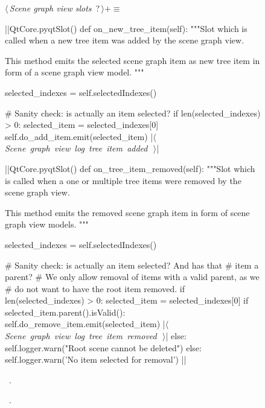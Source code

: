 \documentclass[%
    a4paper,    %
    justified,  %
    nobib,      %
    openany     %
]{tufte-book}
\begin{document}
\begin{figure}
\begin{flushleft} \small
\begin{minipage}{\linewidth}\label{scrap49}\raggedright\small
{} $\langle\,${\itshape Scene graph view slots}\nobreak\ {\footnotesize {?}}$\,\rangle+\equiv$
\vspace{-1ex}
\begin{pythoncode}
|\normalfont{}\fontfamily{}|QtCore.pyqtSlot()
def on_new_tree_item(self):
    """Slot which is called when a new tree item was added by the
    scene graph view.

    This method emits the selected scene graph item as new tree
    item in form of a scene graph view model.
    """

    selected_indexes = self.selectedIndexes()

    # Sanity check: is actually an item selected?
    if len(selected_indexes) > 0:
        selected_item = selected_indexes[0]
        self.do_add_item.emit(selected_item)
        |\hbox{$\langle\,${\itshape Scene graph view log tree item added}\nobreak\ {\footnotesize {}}$\,\rangle$}|

|\normalfont{}\fontfamily{}|QtCore.pyqtSlot()
def on_tree_item_removed(self):
    """Slot which is called when a one or multiple tree items
    were removed by the scene graph view.

    This method emits the removed scene graph item in form of
    scene graph view models.
    """

    selected_indexes = self.selectedIndexes()

    # Sanity check: is actually an item selected? And has that
    # item a parent?
    # We only allow removal of items with a valid parent, as we
    # do not want to have the root item removed.
    if len(selected_indexes) > 0:
        selected_item = selected_indexes[0]
        if selected_item.parent().isValid():
            self.do_remove_item.emit(selected_item)
            |\hbox{$\langle\,${\itshape Scene graph view log tree item removed}\nobreak\ {\footnotesize {}}$\,\rangle$}|
        else:
            self.logger.warn("Root scene cannot be deleted")
    else:
        self.logger.warn('No item selected for removal')
|\NWsep|
\end{pythoncode}
\vspace{1.5ex}
\footnotesize
\begin{list}{}{\setlength{\itemsep}{-\parsep}\setlength{\itemindent}{-\leftmargin}}
\item \NWtxtMacroDefBy\ .
\item \NWtxtMacroRefIn\ .


\end{list}
\end{minipage}
\end{flushleft}
\end{figure}
\end{document}
